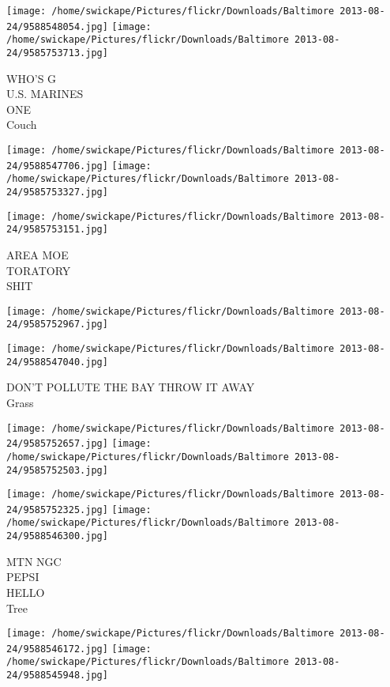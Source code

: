 \documentclass[10pt,letterpaper]{article}
\begin{document}
\texttt{[image: /home/swickape/Pictures/flickr/Downloads/Baltimore 2013-08-24/9588548054.jpg]}
\texttt{[image: /home/swickape/Pictures/flickr/Downloads/Baltimore 2013-08-24/9585753713.jpg]}

WHO'S G\\
U.S. MARINES\\
ONE\\
Couch\\
\pagebreak

\texttt{[image: /home/swickape/Pictures/flickr/Downloads/Baltimore 2013-08-24/9588547706.jpg]}
\texttt{[image: /home/swickape/Pictures/flickr/Downloads/Baltimore 2013-08-24/9585753327.jpg]}

\texttt{[image: /home/swickape/Pictures/flickr/Downloads/Baltimore 2013-08-24/9585753151.jpg]}

AREA MOE\\
TORATORY\\
SHIT\\
\pagebreak

\texttt{[image: /home/swickape/Pictures/flickr/Downloads/Baltimore 2013-08-24/9585752967.jpg]}

\vspace{0.25in}
\texttt{[image: /home/swickape/Pictures/flickr/Downloads/Baltimore 2013-08-24/9588547040.jpg]}

DON'T POLLUTE THE BAY THROW IT AWAY\\
Grass\\
\pagebreak

\texttt{[image: /home/swickape/Pictures/flickr/Downloads/Baltimore 2013-08-24/9585752657.jpg]}
\texttt{[image: /home/swickape/Pictures/flickr/Downloads/Baltimore 2013-08-24/9585752503.jpg]}

\texttt{[image: /home/swickape/Pictures/flickr/Downloads/Baltimore 2013-08-24/9585752325.jpg]}
\texttt{[image: /home/swickape/Pictures/flickr/Downloads/Baltimore 2013-08-24/9588546300.jpg]}

MTN NGC\\
PEPSI\\
HELLO\\
Tree\\
\pagebreak

\texttt{[image: /home/swickape/Pictures/flickr/Downloads/Baltimore 2013-08-24/9588546172.jpg]}
\texttt{[image: /home/swickape/Pictures/flickr/Downloads/Baltimore 2013-08-24/9588545948.jpg]}
\end{document}
